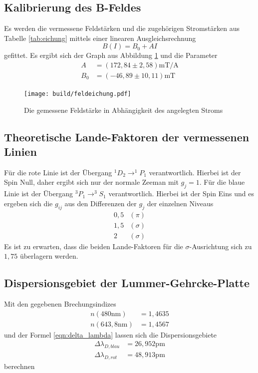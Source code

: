 \subsection{Kalibrierung des B-Feldes}
Es werden die vermessene Feldstärken und die zugehörigen Stromstärken aus Tabelle \ref{tab:eichung} mittels einer linearen Ausgleichsrechnung
\begin{equation}
  B(I) = B_0 + AI
\end{equation}
gefittet. Es ergibt sich der Graph aus Abbildung \ref{fig:eichung} und die Parameter
\begin{align}
  A &= (172,84 \pm 2,58)\si{\milli\tesla\per\ampere}\nonumber\\
  B_0 &= (-46,89 \pm 10,11)\si{\milli\tesla}
\end{align}

\begin{figure}
  \centering
  \texttt{[image: build/feldeichung.pdf]}
  \caption{Die gemessene Feldstärke in Abhängigkeit des angelegten Stroms}
  \label{fig:eichung}
\end{figure}
\subsection{Theoretische Lande-Faktoren der vermessenen Linien}
Für die rote Linie ist der Übergang $^1D_2\rightarrow ^1P_1$ verantwortlich.
Hierbei ist der Spin Null, daher ergibt sich nur der normale Zeeman mit $g_j=1$.
Für die blaue Linie ist der Übergang $^3P_1\rightarrow ^3S_1$ verantwortlich.
Hierbei ist der Spin Eins und es ergeben sich die $g_{ij}$ aus den Differenzen der $g_j$ der einzelnen Niveaus
\begin{align}
  0,5&(\pi)\nonumber\\
  1,5&(\sigma)\nonumber\\
  2&(\sigma)
\end{align}
Es ist zu erwarten, dass die beiden Lande-Faktoren für die $\sigma$-Ausrichtung sich zu $1,75$ überlagern werden.

\subsection{Dispersionsgebiet der Lummer-Gehrcke-Platte}
Mit den gegebenen Brechungsindizes
\begin{align}
  n(480\si{\nano\meter})&=1,4635\nonumber\\
  n(643,8\si{\nano\meter})&=1,4567
\end{align}
und der Formel \eqref{eqn:delta_lambda} lassen sich die Dispersionsgebiete
\begin{align}
  \Delta \lambda_{D,blau} &= 26,952\si{\pico\meter}\nonumber\\
  \Delta \lambda_{D,rot}  &= 48,913\si{\pico\meter}
  \label{eqn:dispersion}
\end{align}
berechnen

